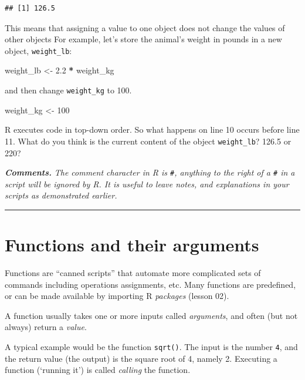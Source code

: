 \documentclass[
]{article}
\newenvironment{Shaded}{\begin{snugshade}}{\end{snugshade}}
\newcommand{\DecValTok}[1]{\textcolor[rgb]{0.00,0.00,0.81}{#1}}
\newcommand{\FloatTok}[1]{\textcolor[rgb]{0.00,0.00,0.81}{#1}}
\newcommand{\NormalTok}[1]{#1}
\newcommand{\OperatorTok}[1]{\textcolor[rgb]{0.81,0.36,0.00}{\textbf{#1}}}
\newcommand{\StringTok}[1]{\textcolor[rgb]{0.31,0.60,0.02}{#1}}
\begin{document}
\begin{verbatim}
## [1] 126.5
\end{verbatim}

This means that assigning a value to one object does not change the
values of other objects For example, let's store the animal's weight in
pounds in a new object, \texttt{weight\_lb}:

\begin{Shaded}
\begin{Highlighting}[]
\NormalTok{weight_lb <-}\StringTok{ }\FloatTok{2.2} \OperatorTok{*}\StringTok{ }\NormalTok{weight_kg}
\end{Highlighting}
\end{Shaded}

and then change \texttt{weight\_kg} to 100.

\begin{Shaded}
\begin{Highlighting}[]
\NormalTok{weight_kg <-}\StringTok{ }\DecValTok{100}
\end{Highlighting}
\end{Shaded}

R executes code in top-down order. So what happens on line 10 occurs
before line 11. What do you think is the current content of the object
\texttt{weight\_lb}? 126.5 or 220?

\emph{\textbf{Comments.}} \emph{The comment character in R is
\texttt{\#}, anything to the right of a \texttt{\#} in a script will be
ignored by R. It is useful to leave notes, and explanations in your
scripts as demonstrated earlier.}

\begin{center}\rule{0.5\linewidth}{0.5pt}\end{center}

\hypertarget{functions-and-their-arguments}{%
\section{Functions and their
arguments}\label{functions-and-their-arguments}}

Functions are ``canned scripts'' that automate more complicated sets of
commands including operations assignments, etc. Many functions are
predefined, or can be made available by importing R \emph{packages}
(lesson 02).

A function usually takes one or more inputs called \emph{arguments}, and
often (but not always) return a \emph{value}.

A typical example would be the function \texttt{sqrt()}. The input is
the number \texttt{4}, and the return value (the output) is the square
root of 4, namely 2. Executing a function (`running it') is called
\emph{calling} the function.
\end{document}
